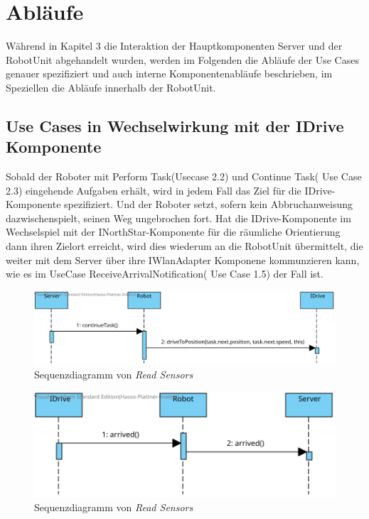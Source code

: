 \section{Abläufe}

Während in Kapitel 3 die Interaktion der Hauptkomponenten Server und der RobotUnit abgehandelt wurden, werden im Folgenden die Abläufe der Use Cases genauer spezifiziert und auch interne Komponentenabläufe beschrieben, im Speziellen die Abläufe innerhalb der RobotUnit.

\subsection*{Use Cases in Wechselwirkung mit der IDrive Komponente }
Sobald der Roboter mit Perform Task(Usecase 2.2)  und Continue Task( Use Case  2.3) eingehende Aufgaben erhält, wird in jedem Fall das Ziel für die IDrive-Komponente spezifiziert. Und der Roboter setzt, sofern kein Abbruchanweisung dazwischenspielt, seinen Weg ungebrochen fort. Hat die IDrive-Komponente im Wechselspiel mit der INorthStar-Komponente für die räumliche Orientierung dann ihren Zielort erreicht, wird dies wiederum an die RobotUnit übermittelt, die weiter mit dem Server über ihre IWlanAdapter Komponene kommunzieren kann, wie es im UseCase ReceiveArrivalNotification( Use Case 1.5) der Fall ist.
\\

		\begin{figure}[H]
		\centering
		\includegraphics[width=1\textwidth]{img/2-Entwurf-ContinueTask.svg}
		\caption{Sequenzdiagramm von \emph{Read Sensors}}
		\label{ReadSensors}
	\end{figure}
	
	\begin{figure}[H]
		\centering
		\includegraphics[width=1\textwidth]{img/2-Entwurf-ReceiveArrivalNotification.svg}
		\caption{Sequenzdiagramm von \emph{Read Sensors}}
		\label{ReadSensors}
	\end{figure}

